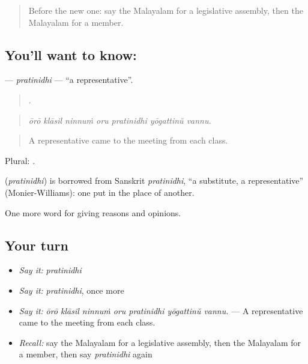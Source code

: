 \label{lesson:ML-C422-pratinidhi}



\begin{quote}
Before the new one: say the Malayalam for a legislative assembly, then the Malayalam for a member.
\end{quote}

\subsection*{You'll want to know: }
\textbf{} — \emph{pratinidhi} — \textquotedblleft{}a representative\textquotedblright{}.

\begin{quote}
      .
\end{quote}

\begin{quote}
\emph{ōrō klāsil ninnuṁ oru pratinidhi yōgattinŭ vannu.}
\end{quote}

\begin{quote}
A representative came to the meeting from each class.
\end{quote}

Plural: .

\begin{cousinweb}
\textbf{} (\emph{pratinidhi}) is borrowed from Sanskrit \emph{pratinidhi}, \textquotedblleft{}a substitute, a representative\textquotedblright{} (Monier-Williams): one put in the place of another.
\end{cousinweb}

\begin{grammarlens}[title={What you've built}]
One more word for giving reasons and opinions.
\end{grammarlens}

\subsection*{Your turn}
\begin{itemize}
\raggedright
  \item \emph{Say it:} \emph{pratinidhi}
  \item \emph{Say it:} \emph{pratinidhi}, once more
  \item \emph{Say it:} \emph{ōrō klāsil ninnuṁ oru pratinidhi yōgattinŭ vannu.} — A representative came to the meeting from each class.
  \item \emph{Recall:} say the Malayalam for a legislative assembly, then the Malayalam for a member, then say \emph{pratinidhi} again
\end{itemize}

